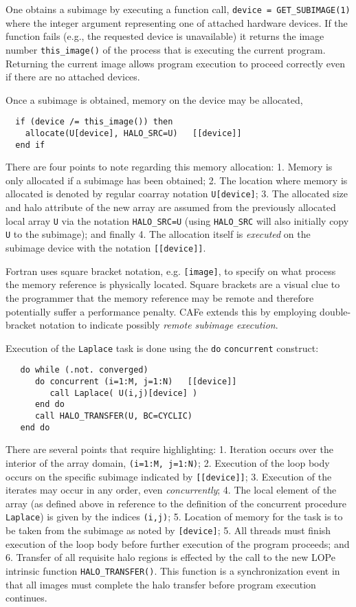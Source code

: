 One obtains a subimage by executing a function call,
\texttt{device = GET\_SUBIMAGE(1)}
where the integer argument representing one of attached hardware
devices.  If the function fails (e.g., the requested
device is unavailable) it returns the image number
\texttt{this\_image()} of the process that is executing the current
program.  Returning the current image allows program execution to
proceed correctly even if there are no attached devices.

Once a subimage is obtained, memory on the device may be allocated,
\begin{verbatim}
  if (device /= this_image()) then
    allocate(U[device], HALO_SRC=U)   [[device]]
  end if
\end{verbatim}
There are four points to note regarding this memory allocation: 1. Memory is only allocated if a
subimage has been obtained; 2. The location where memory is allocated is denoted by regular coarray
notation \texttt{U[device]}; 3. The allocated size and halo attribute of the new array are assumed
from the previously allocated local array \texttt{U} via the notation \texttt{HALO\_SRC=U} (using
\texttt{HALO\_SRC} will also initially copy \texttt{U} to the subimage); and finally 4. The
allocation itself is \emph{executed} on the subimage device with the notation \texttt{[[device]]}.

Fortran uses square bracket notation, e.g. \texttt{[image]}, to specify on what process the
memory reference is physically located.  Square brackets are a visual clue to the
programmer that the memory reference may be remote and therefore potentially suffer a
performance penalty.  CAFe extends this by employing double-bracket notation to indicate
possibly \emph{remote subimage execution}.

Execution of the \texttt{Laplace} task is done using the \texttt{do}
\texttt{concurrent} construct:
\begin{verbatim}
   do while (.not. converged)
      do concurrent (i=1:M, j=1:N)   [[device]]
         call Laplace( U(i,j)[device] )
      end do
      call HALO_TRANSFER(U, BC=CYCLIC)
   end do
\end{verbatim}
There are several points that require highlighting: 1. Iteration occurs over the interior
of the array domain, \texttt{(i=1:M, j=1:N)}; 2. Execution of the loop body occurs on the
specific subimage indicated by \texttt{[[device]]}; 3. Execution of the iterates may occur
in any order, even \emph{concurrently}; 4. The local element of the array (as
defined above in reference to the definition of the concurrent procedure
\texttt{Laplace}) is given by the indices \texttt{(i,j)}; 5. Location of memory for the
task is to be taken from the subimage as noted by \texttt{[device]}; 5. All threads must finish
execution of the loop body before further execution of the program proceeds; and 6. Transfer of
all requisite halo regions is effected by the call to the new LOPe intrinsic function
\texttt{HALO\_TRANSFER()}.  This function is a synchronization event in that all images must
complete the halo transfer before program execution continues.

